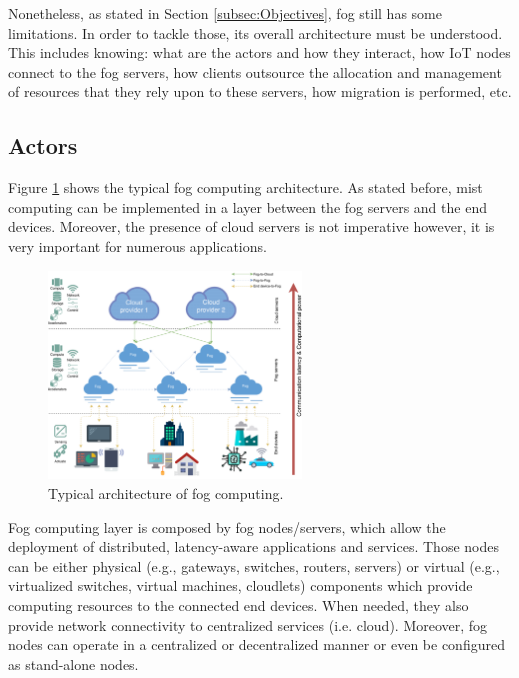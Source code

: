 Nonetheless, as stated in Section \ref{subsec:Objectives}, fog still has some limitations. In order to tackle those, its overall architecture must be understood. This includes knowing: what are the actors and how they interact, how IoT nodes connect to the fog servers, how clients outsource the allocation and management of resources that they rely upon to these servers, how migration is performed, etc.

\subsection{Actors}
Figure \ref{fog_architecture} shows the typical fog computing architecture. As stated before, mist computing can be implemented in a layer between the fog servers and the end devices. Moreover, the presence of cloud servers is not imperative however, it is very important for numerous applications.\\
\begin{figure}
	\centering
	\includegraphics[width=0.60\textwidth]{images/fog_architecture/fog_architecture}
	\caption{Typical architecture of fog computing.}
	\label{fog_architecture}
\end{figure}
\noindent\tab Fog computing layer is composed by fog nodes/servers, which allow the deployment of distributed, latency-aware applications and services. Those nodes can be either physical (e.g., gateways, switches, routers, servers) or virtual (e.g., virtualized switches, virtual machines, cloudlets) components which provide computing resources to the connected end devices. When needed, they also provide network connectivity to centralized services (i.e. cloud). Moreover, fog nodes can operate in a centralized or decentralized manner or even be configured as stand-alone nodes.\\ %
